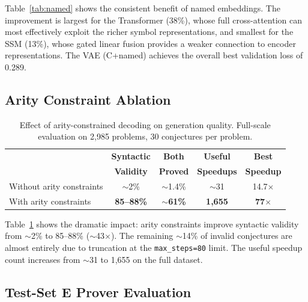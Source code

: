 \documentclass{article}
\begin{document}
Table~\ref{tab:named} shows the consistent benefit of named embeddings.
The improvement is largest for the Transformer (38\%), whose full cross-attention
can most effectively exploit the richer symbol representations, and smallest for
the SSM (13\%), whose gated linear fusion provides a weaker connection to encoder
representations. The VAE (C+named) achieves the overall best validation loss of 0.289.

\subsection{Arity Constraint Ablation}

\begin{table}[t]
\centering
\caption{Effect of arity-constrained decoding on generation quality.
Full-scale evaluation on 2,985 problems, 30 conjectures per problem.}
\label{tab:arity}
\begin{tabular}{lcccc}
\toprule
& \textbf{Syntactic} & \textbf{Both} & \textbf{Useful} & \textbf{Best} \\
& \textbf{Validity} & \textbf{Proved} & \textbf{Speedups} & \textbf{Speedup} \\
\midrule
Without arity constraints & ${\sim}$2\% & ${\sim}$1.4\% & ${\sim}$31 & 14.7$\times$ \\
With arity constraints & \textbf{85--88\%} & \textbf{${\sim}$61\%} & \textbf{1,655} & \textbf{77$\times$} \\
\bottomrule
\end{tabular}
\end{table}

Table~\ref{tab:arity} shows the dramatic impact: arity constraints improve
syntactic validity from ${\sim}$2\% to 85--88\% (${\sim}$43$\times$).
The remaining ${\sim}$14\% of invalid conjectures are almost entirely due to
truncation at the \texttt{max\_steps=80} limit. The useful speedup count
increases from ${\sim}$31 to 1,655 on the full dataset.

\subsection{Test-Set E Prover Evaluation}
\end{document}
